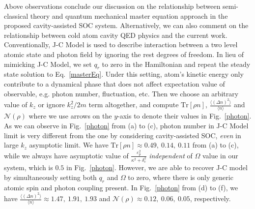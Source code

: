 \documentclass[atoms,article,submit,moreauthors,pdftex,12pt,a4paper]{mdpi}
\begin{document}

Above observations conclude our discussion on the relationship between semi-classical theory and quantum mechanical master equation approach in the proposed cavity-assisted SOC system. Alternatively, we can also comment on the relationship between cold atom cavity QED physics and the current work. Conventionally, J-C Model is used to describe interaction between a two level atomic state and photon field by ignoring the rest degrees of freedom. In lieu of mimicking J-C Model, we set $q_r$ to zero in the Hamiltonian and repeat the steady state solution to Eq.~\ref{masterEq}. Under this setting, atom's kinetic energy only contribute to a dynamical phase that does not affect expectation value of observable, e.g. photon number, fluctuation, etc. Then we choose an arbitrary value of $k_z$ or ignore $k_z^2/2m$ term altogether, and compute $\text{Tr}[\rho n]$, $\frac{\langle(\Delta n)^{2}\rangle}{\langle n\rangle}$ and $\mathcal{N}(\rho)$ where we use arrows on the $y$-axis to denote their values in Fig.~\ref{photon}. As we can observe in Fig.~\ref{photon} from (a) to (c), photon number in J-C Model limit is very different from the one by considering cavity-assisted SOC, {\em even} in large $k_z$ asymptotic limit. We have $\text{Tr}[\rho n] \approx 0.49,\ 0.14,\ 0.11$ from (a) to (c), while we always have asymptotic value of $\frac{\varepsilon_p^2}{\kappa^2+\delta_c^2}$ {\em independent} of $\Omega$ value in our system, which is $0.5$ in Fig.~\ref{photon}. However, we are able to recover J-C model by simultaneously setting both $q_r$ and $\Omega$ to zero, where there is only generic atomic spin and photon coupling present. In Fig.~\ref{photon} from (d) to (f), we have $\frac{\langle(\Delta n)^{2}\rangle}{\langle n\rangle}\approx1.47,\ 1.91,\ 1.93$ and $\mathcal{N}(\rho)\approx 0.12,\ 0.06,\ 0.05$, respectively.    
\end{document}
